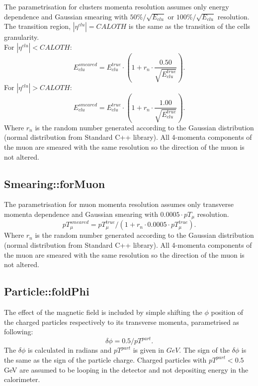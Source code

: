The parametrisation for clusters momenta resolution assumes only 
energy dependence and Gaussian
smearing with $50\%/\sqrt{E_{clu}}$ or $100\%/\sqrt{E_{clu}}$
resolution.
The transition region, $|\eta^{clu}| = CALOTH$  is the same as the 
transition of the cells granularity. \\
For  $|\eta^{clu}| < CALOTH$:
\begin{equation}
 E_{clu}^{smeared}  = 
E_{clu}^{true} \cdot (1+ r_n \cdot \frac{0.50}{\sqrt{E_{clu}^{true}}}). 
\end{equation}
For  $|\eta^{clu}| > CALOTH$:
\begin{equation}
 E_{clu}^{smeared}  = 
E_{clu}^{true} \cdot (1+ r_n \cdot \frac{1.00}{\sqrt{E_{clu}^{true}}}). 
\end{equation}
Where $r_n$ is the random number generated according to the Gaussian
distribution (normal distribution from Standard C++ library).
All 4-momenta components of the muon are smeared with the same
resolution so the direction of the muon is not altered. 

\subsection{Smearing::forMuon}

The parametrisation for muon momenta resolution assumes only 
transverse momenta dependence and Gaussian
smearing with $0.0005 \cdot pT_{\mu}$ resolution.
\begin{equation}
 pT_{\mu}^{smeared}  = 
pT_{\mu}^{true}/(1+ r_n \cdot 0.0005 \cdot pT_{\mu}^{true}). 
\end{equation}
Where $r_n$ is the random number generated according to the Gaussian
distribution (normal distribution from Standard C++ library).
All 4-momenta components of the muon are smeared with the same
resolution so the direction of the muon is not altered. 

\subsection{Particle::foldPhi}

The effect of the magnetic field is included by simple shifting the
$\phi$ position of the charged particles respectively to its
transverse momenta, parametrised as following:
\begin{equation}
 \delta \phi   =  0.5 / pT^{part}. 
\end{equation}
The $ \delta \phi$ is calculated in radians and $pT^{part}$ is
given in $GeV$.
The sign of the  $ \delta \phi$ is the same as the sign of the
particle charge.
Charged particles with  $pT^{part} < 0.5$ GeV are assumed to be
looping in the detector and not depositing energy in the calorimeter.


